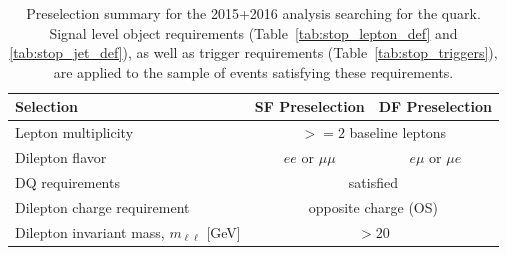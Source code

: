 \begin{table}[!htb]
    \begin{center}
        \begin{tabular}{l|c| c}
            \hline
            \hline
            \textbf{Selection} & \textbf{SF Preselection} & \textbf{DF Preselection} \\
            \hline
            Lepton multiplicity & \multicolumn{2}{c}{$>=2$ baseline leptons} \\
            Dilepton flavor & $ee$ or $\mu \mu$ & $e\mu$ or $\mu e$ \\
            DQ requirements & \multicolumn{2}{c}{satisfied} \\
            Dilepton charge requirement & \multicolumn{2}{c}{opposite charge (OS)} \\
            Dilepton invariant mass, $m_{\ell\ell}$ [GeV] & \multicolumn{2}{c}{$>20$} \\
            \hline
            \hline
        \end{tabular}
        \caption{
            Preselection summary for the 2015+2016 analysis searching for the \stopone quark.
            Signal level object requirements (Table~\ref{tab:stop_lepton_def} and \ref{tab:stop_jet_def}), as well as trigger requirements
            (Table~\ref{tab:stop_triggers}), are applied
            to the sample of events satisfying these requirements.
        }
        \label{tab:stop_preselection}
    \end{center}
\end{table}
